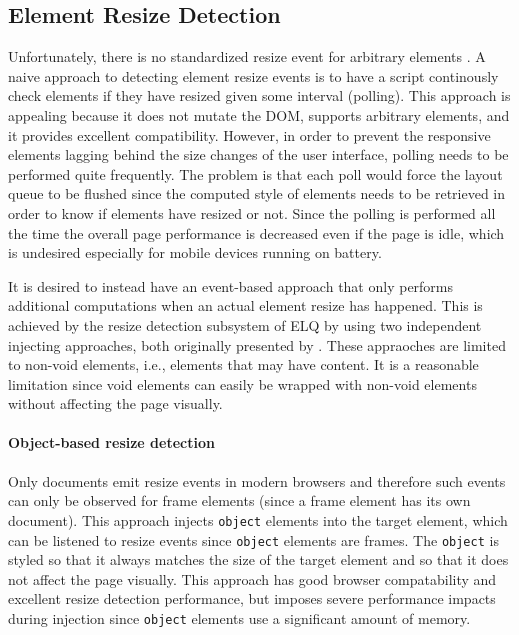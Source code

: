 \documentclass{acm_proc_article-sp}
\newcommand{\code}[1]{\texttt{#1}}
\newcommand{\elq}{ELQ}
\newcommand{\gls}[1]{#1}
\begin{document}
  \subsection{Element Resize Detection}\label{sec:imp_erd}
    Unfortunately, there is no standardized resize event for arbitrary elements \cite{w3c_dom2_events}.
    A naive approach to detecting element resize events is to have a script continously check elements if they have resized given some interval (polling).
    This approach is appealing because it does not mutate the \gls{DOM}, supports arbitrary elements, and it provides excellent compatibility.
    However, in order to prevent the \gls{responsive} elements lagging behind the size changes of the user interface, polling needs to be performed quite frequently.
    The problem is that each poll would force the layout queue to be flushed since the computed style of elements needs to be retrieved in order to know if elements have resized or not.
    Since the polling is performed all the time the overall page performance is decreased even if the page is idle, which is undesired especially for mobile devices running on battery.



    It is desired to instead have an event-based approach that only performs additional computations when an actual element resize has happened.
    This is achieved by the resize detection subsystem of \elq{} by using two independent injecting approaches, both originally presented by \cite{backalley}.
    These appraoches are limited to non-void elements, i.e., elements that may have content.
    It is a reasonable limitation since void elements can easily be wrapped with non-void elements without affecting the page visually.

    \paragraph{Object-based resize detection}
    Only documents emit resize events in modern browsers and therefore such events can only be observed for frame elements (since a frame \gls{element} has its own \gls{document}).
    This approach injects \code{object} elements into the target element, which can be listened to resize events since \code{object} elements are frames.
    The \code{object} is styled so that it always matches the size of the target \gls{element} and so that it does not affect the page visually.
    This approach has good browser compatability and excellent resize detection performance, but imposes severe performance impacts during injection since \code{object} elements use a significant amount of memory.
\end{document}
